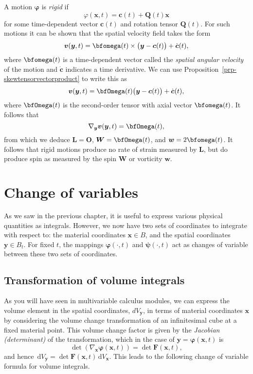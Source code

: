 \documentclass[
  letterpaper,
  DIV=11,
  numbers=noendperiod]{scrreprt}
\theoremstyle{plain}
\theoremstyle{remark}
\begin{document}
A motion \({\boldsymbol{\varphi}}\) is \emph{rigid} if
\[\varphi({\boldsymbol{x}},t) = {\boldsymbol{c}}(t)+{\boldsymbol{Q}}(t){\boldsymbol{x}}\]
for some time-dependent vector \({\boldsymbol{c}}(t)\) and rotation
tensor \({\boldsymbol{Q}}(t)\). For such motions it can be shown that
the spatial velocity field takes the form
\[{\boldsymbol{v}}({\boldsymbol{y}},t) = \bfomega(t)\times\big({\boldsymbol{y}}-{\boldsymbol{c}}(t)\big)+\dot{{\boldsymbol{c}}}(t),\]
where \(\bfomega(t)\) is a time-dependent vector called the
\emph{spatial angular velocity} of the motion and
\(\dot{{\boldsymbol{c}}}\) indicates a time derivative. We can use
Proposition~\ref{prp-skewtensorvectorproduct} to write this as
\[{\boldsymbol{v}}({\boldsymbol{y}},t) = \bfOmega(t)\big({\boldsymbol{y}}-{\boldsymbol{c}}(t)\big)+\dot{\boldsymbol{c}}(t),\]
where \(\bfOmega(t)\) is the second-order tensor with axial vector
\(\bfomega(t)\). It follows that
\[\nabla_{\boldsymbol{y}}{\boldsymbol{v}}({\boldsymbol{y}},t) = \bfOmega(t),\]
from which we deduce \({\boldsymbol{L}}= {\boldsymbol{O}}\),
\({\boldsymbol{W}}= \bfOmega(t)\), and
\({\boldsymbol{w}}= 2\bfomega(t)\). It follows that rigid motions
produce no rate of strain measured by \({\boldsymbol{L}}\), but do
produce spin as measured by the spin \({\boldsymbol{W}}\) or vorticity
\({\boldsymbol{w}}\).

\section{Change of variables}\label{change-of-variables}

As we saw in the previous chapter, it is useful to express various
physical quantities as integrals. However, we now have two sets of
coordinates to integrate with respect to: the material coordinates
\({\boldsymbol{x}}\in B\), and the spatial coordinates
\({\boldsymbol{y}}\in B_t\). For fixed \(t\), the mappings
\({\boldsymbol{\varphi}}(\cdot,t)\) and \({\boldsymbol{\psi}}(\cdot,t)\)
act as changes of variable between these two sets of coordinates.

\subsection{Transformation of volume
integrals}\label{transformation-of-volume-integrals}

As you will have seen in multivariable calculus modules, we can express
the volume element in the spatial coordinates, \(dV_{\boldsymbol{y}}\),
in terms of material coordinates \({\boldsymbol{x}}\) by considering the
volume change transformation of an infinitesimal cube at a fixed
material point. This volume change factor is given by the \emph{Jacobian
(determinant)} of the transformation, which in the case of
\({\boldsymbol{y}}= {\boldsymbol{\varphi}}({\boldsymbol{x}},t)\) is
\[\det(\nabla_{\boldsymbol{x}}{\boldsymbol{\varphi}}({\boldsymbol{x}},t))=\det{\boldsymbol{F}}({\boldsymbol{x}},t),\]
and hence
\({\,{\mathrm{d}}V_{{\boldsymbol{y}}}}= \det{\boldsymbol{F}}({\boldsymbol{x}},t){\,{\mathrm{d}}V_{{\boldsymbol{x}}}}\).
This leads to the following change of variable formula for volume
integrals.
\end{document}
